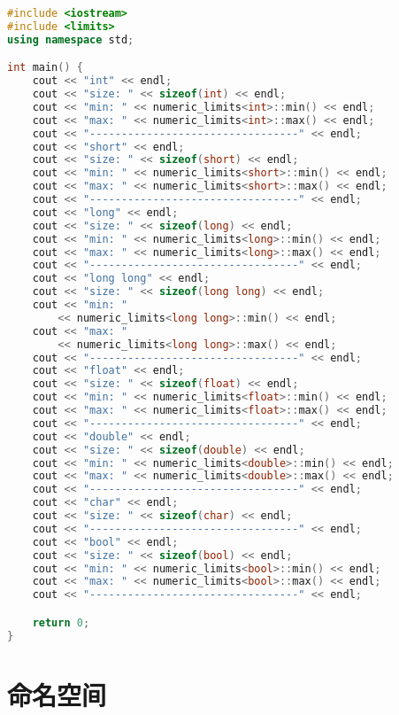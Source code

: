 
\begin{lstlisting}[language=C++]
#include <iostream>
#include <limits>
using namespace std;

int main() {
    cout << "int" << endl;
    cout << "size: " << sizeof(int) << endl;
    cout << "min: " << numeric_limits<int>::min() << endl;
    cout << "max: " << numeric_limits<int>::max() << endl;
    cout << "---------------------------------" << endl;
    cout << "short" << endl;
    cout << "size: " << sizeof(short) << endl;
    cout << "min: " << numeric_limits<short>::min() << endl;
    cout << "max: " << numeric_limits<short>::max() << endl;
    cout << "---------------------------------" << endl;
    cout << "long" << endl;
    cout << "size: " << sizeof(long) << endl;
    cout << "min: " << numeric_limits<long>::min() << endl;
    cout << "max: " << numeric_limits<long>::max() << endl;
    cout << "---------------------------------" << endl;
    cout << "long long" << endl;
    cout << "size: " << sizeof(long long) << endl;
    cout << "min: " 
        << numeric_limits<long long>::min() << endl;
    cout << "max: "
        << numeric_limits<long long>::max() << endl;
    cout << "---------------------------------" << endl;
    cout << "float" << endl;
    cout << "size: " << sizeof(float) << endl;
    cout << "min: " << numeric_limits<float>::min() << endl;
    cout << "max: " << numeric_limits<float>::max() << endl;
    cout << "---------------------------------" << endl;
    cout << "double" << endl;
    cout << "size: " << sizeof(double) << endl;
    cout << "min: " << numeric_limits<double>::min() << endl;
    cout << "max: " << numeric_limits<double>::max() << endl;
    cout << "---------------------------------" << endl;
    cout << "char" << endl;
    cout << "size: " << sizeof(char) << endl;
    cout << "---------------------------------" << endl;
    cout << "bool" << endl;
    cout << "size: " << sizeof(bool) << endl;
    cout << "min: " << numeric_limits<bool>::min() << endl;
    cout << "max: " << numeric_limits<bool>::max() << endl;
    cout << "---------------------------------" << endl;

    return 0;
}
\end{lstlisting}

\newpage

\section{命名空间}

